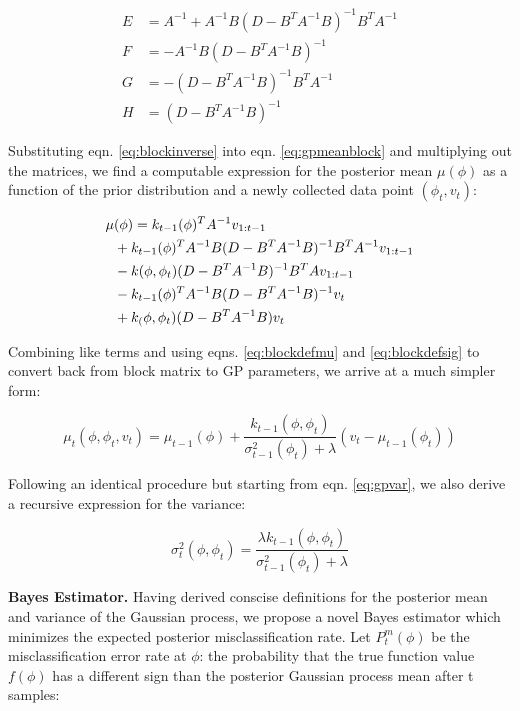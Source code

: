 \documentclass[letterpaper, 10 pt, conference]{ieeeconf}
\begin{document}
\begin{align}
    E &= A^{-1}+A^{-1}B(D-B^T A^{-1} B)^{-1}B^T A^{-1} \nonumber \\
    F &= -A^{-1}B(D-B^T A^{-1} B)^{-1} \nonumber \\
    G &= -(D-B^T A^{-1} B)^{-1}B^T A^{-1} \nonumber \\
    H &= (D-B^T A^{-1} B)^{-1} \nonumber
\end{align}
\smallskip

Substituting eqn. \ref{eq:blockinverse} into eqn. \ref{eq:gpmeanblock} and multiplying out the matrices, we find a computable expression for the posterior mean $\mu(\phi)$ as a function of the prior distribution and a newly collected data point $(\phi_t,v_t)$:

\begin{align}
\begin{split}
    \tiny
    \mu&(\phi) = k_{t-1}(\phi)^T A^{-1} v_{1:t-1} \\
    &+ k_{t-1}(\phi)^T A^{-1} B (D-B^T A^{-1} B)^{-1} B^T A^{-1} v_{1:t-1} \\
    &- k(\phi,\phi_t)(D-B^T A^{-1} B)^{-1} B^T A v_{1:t-1} \\
    &- k_{t-1}(\phi)^T A^{-1} B(D-B^T A^{-1}B)^{-1}v_t \\
    &+ k_(\phi,\phi_t)(D-B^T A^{-1}B)v_t
\end{split}
\end{align}

Combining like terms and using eqns. \ref{eq:blockdefmu} and \ref{eq:blockdefsig} to convert back from block matrix to GP parameters, we arrive at a much simpler form:

\begin{equation}
    \mu_t(\phi,\phi_t,v_t) = \mu_{t-1}(\phi) + \frac{k_{t-1}(\phi,\phi_t)}{\sigma_{t-1}^2(\phi_t)+\lambda}(v_t-\mu_{t-1}(\phi_t))
    \label{eq:recmu}
\end{equation}

Following an identical procedure but starting from eqn. \ref{eq:gpvar}, we also derive a recursive expression for the variance:

\begin{equation}
    \sigma_t^2(\phi,\phi_t) = \frac{\lambda k_{t-1}(\phi,\phi_t)}{\sigma_{t-1}^2(\phi_t)+\lambda}
    \label{eq:recsig}
\end{equation}
\smallskip

\noindent\textbf{Bayes Estimator.} Having derived conscise definitions for the posterior mean and variance of the Gaussian process, we propose a novel Bayes estimator which minimizes the expected posterior misclassification rate. Let $P^m_t(\phi)$ be the misclassification error rate at $\phi$: the probability that the true function value $f(\phi)$ has a different sign than the posterior Gaussian process mean after t samples: 
\end{document}
